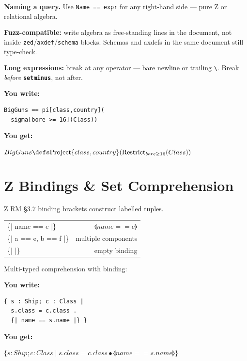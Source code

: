 \documentclass[10pt,landscape,a4paper]{article}
\newcommand{\kw}[1]{\texttt{\bfseries #1}}
\newenvironment{exwrite}%
  {\par\noindent\scriptsize\textbf{You write:}\par\vspace{0pt}\scriptsize}%
  {\vspace{1pt}}
\newenvironment{exget}%
  {\par\noindent\scriptsize\textbf{You get:}\par\vspace{0pt}\small}%
  {\par\vspace{3pt}}
\begin{document}
\begin{multicols}{3}
\smallskip
{\scriptsize\textbf{Naming a query.} Use \texttt{Name == expr} for any right-hand side — pure Z or relational algebra.}

\smallskip
{\scriptsize\textbf{Fuzz-compatible:} write algebra as free-standing lines in the document, not inside \texttt{zed}/\texttt{axdef}/\texttt{schema} blocks. Schemas and axdefs in the same document still type-check.}

\smallskip
{\scriptsize\textbf{Long expressions:} break at any operator — bare newline or trailing \texttt{\textbackslash}. Break \emph{before} \kw{setminus}, not after.}

\begin{exwrite}
\begin{verbatim}
BigGuns == pi[class,country](
  sigma[bore >= 16](Class))
\end{verbatim}
\end{exwrite}
\begin{exget}
\begin{center}
\noindent$BigGuns \defs \mathrm{Project}\{class,country\}(\mathrm{Restrict}_{bore \geq 16}(Class))$
\end{center}
\end{exget}

\section{Z Bindings \& Set Comprehension}

{\scriptsize Z RM §3.7 binding brackets construct labelled tuples.}

\begin{tabularx}{\columnwidth}{LR}
\{| name == e |\}    & $\lblot name == e \rblot$ \\
\{| a == e, b == f |\} & multiple components \\
\{| |\}              & empty binding \\
\end{tabularx}

\smallskip
{\scriptsize Multi-typed comprehension with binding:}

\begin{exwrite}
\begin{verbatim}
{ s : Ship; c : Class |
  s.class = c.class .
  {| name == s.name |} }
\end{verbatim}
\end{exwrite}
\begin{exget}
\begin{center}
$\{ s : Ship; c : Class \mid s.class = c.class \bullet \lblot name == s.name \rblot \}$
\end{center}
\end{exget}


\end{multicols}
\end{document}
